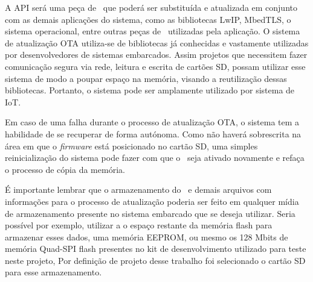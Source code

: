 A API será uma peça de \software\ que poderá ser substituída e atualizada em conjunto com as demais aplicações do sistema, como as bibliotecas LwIP, MbedTLS, o sistema operacional, entre outras peças de \software\ utilizadas pela aplicação. 
O sistema de atualização OTA utiliza-se de bibliotecas já conhecidas e vastamente utilizadas por desenvolvedores de sistemas embarcados. Assim projetos que necessitem fazer comunicação segura via rede, leitura e escrita de cartões SD, possam utilizar esse sistema de modo a poupar espaço na memória, visando a reutilização dessas bibliotecas. Portanto, o sistema pode ser amplamente utilizado por sistema de IoT. 

Em caso de uma falha durante o processo de atualização OTA, o sistema tem a habilidade de se recuperar de forma autónoma. Como não haverá sobrescrita na área em que o \textit{firmware} está posicionado no cartão SD, uma simples reinicialização do sistema pode fazer com que o \bootloader\ seja ativado novamente e refaça o processo de cópia da memória.

É importante lembrar que o armazenamento do \firmware\ e demais arquivos com informações para o processo de atualização poderia ser feito em qualquer mídia de armazenamento presente no sistema embarcado que se deseja utilizar. Seria possível por exemplo, utilizar a o espaço restante da memória flash para armazenar esses dados, uma memória EEPROM, ou mesmo os 128 Mbits de memória Quad-SPI flash presentes no kit de desenvolvimento utilizado para teste neste projeto, Por definição de projeto desse trabalho foi selecionado o cartão SD para esse armazenamento.



